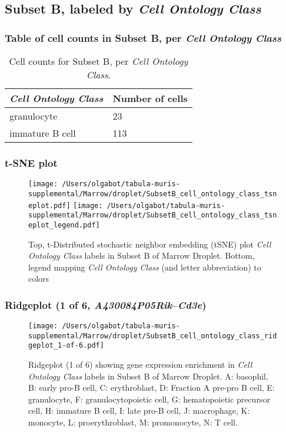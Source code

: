 \subsection{Subset B, labeled by \emph{Cell Ontology Class}}
\subsubsection{Table of cell counts in Subset B, per \emph{Cell Ontology Class}}\begin{table}[h]
\centering
\label{my-label}
\begin{tabular}{@{}ll@{}}
\toprule

\emph{Cell Ontology Class}& Number of cells \\ \midrule
granulocyte & 23 \\

immature B cell & 113 \\
\bottomrule
\end{tabular}
\caption{Cell counts for Subset B, per \emph{Cell Ontology Class}.}
\end{table}

\clearpage
\subsubsection{t-SNE plot}
\begin{figure}[h]
\centering
\texttt{[image: /Users/olgabot/tabula-muris-supplemental/Marrow/droplet/SubsetB\_cell\_ontology\_class\_tsneplot.pdf]}
\texttt{[image: /Users/olgabot/tabula-muris-supplemental/Marrow/droplet/SubsetB\_cell\_ontology\_class\_tsneplot\_legend.pdf]}
\caption{Top, t-Distributed stochastic neighbor embedding (tSNE) plot  \emph{Cell Ontology Class} labels in Subset B of Marrow Droplet. Bottom, legend mapping \emph{Cell Ontology Class} (and letter abbreviation) to colors}
\end{figure}


\clearpage

\subsubsection{Ridgeplot (1 of 6, \emph{A430084P05Rik}--\emph{Cd3e})}
\begin{figure}[h]
\centering
\texttt{[image: /Users/olgabot/tabula-muris-supplemental/Marrow/droplet/SubsetB\_cell\_ontology\_class\_ridgeplot\_1-of-6.pdf]}

\caption{ Ridgeplot (1 of 6)  showing gene expression enrichment in \emph{Cell Ontology Class} labels in Subset B of Marrow Droplet. A: basophil, B: early pro-B cell, C: erythroblast, D: Fraction A pre-pro B cell, E: granulocyte, F: granulocytopoietic cell, G: hematopoietic precursor cell, H: immature B cell, I: late pro-B cell, J: macrophage, K: monocyte, L: proerythroblast, M: promonocyte, N: T cell.}
\end{figure}


